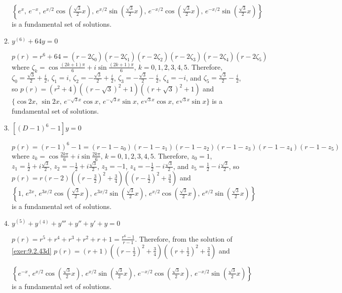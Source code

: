 \documentclass{ximera}
\begin{document}
\begin{problem}
\begin{enumerate}
\begin{solution}
 $\left\{e^x,\,e^{-x}
,\,e^{x/2}\cos\left(\frac{\sqrt3}{2}x\right),
\,e^{x/2}\sin\left(\frac{\sqrt3}{2}x\right),
\,e^{-x/2}\cos\left(\frac{\sqrt3}{2}x\right),
\,e^{-x/2}\sin\left(\frac{\sqrt3}{2}x\right)\right\}$
is a fundamental set of solutions.
\end{solution}

\item $y^{(6)}+64y=0$

\begin{solution}
$p(r)=r^6+64=(r-2\zeta_0)(r-2\zeta_1)(r-2\zeta_2)(r-2\zeta_3)
(r-2\zeta_4)(r-2\zeta_5)$ where
$\zeta_k=\cos\frac{(2k+1)\pi}{6}+i\sin\frac{(2k+1)\pi}{6}$,
$k=0,1,2,3,4,5$. Therefore,
$\zeta_0=\frac{\sqrt3}{2}+\frac{i}{2}$,
$\zeta_1=i$,
$\zeta_2=-\frac{\sqrt3}{2}+\frac{i}{2}$,
$\zeta_3=-\frac{\sqrt3}{2}-\frac{i}{2}$,
$\zeta_4=-i$, and
$\zeta_5=\frac{\sqrt3}{2}-\frac{i}{2}$,  so
$p(r)=(r^2+4)((r-\sqrt3)^2+1)((r+\sqrt3)^2+1)$ and
 $\{\cos2x,\,\sin2x,\,e^{-\sqrt3x}\cos x,\,e^{-\sqrt3x}\sin x
,\,e^{\sqrt3x}\cos x,\,e^{\sqrt3x}\sin x\}$
is a fundamental set of solutions.
\end{solution}

\item $\left[(D-1)^6-1\right]y=0$

\begin{solution}
$p(r)=(r-1)^6-1=(r-1-z_0)(r-1-z_1)(r-1-z_2)(r-1-z_3)(r-1-z_4)(r-1-z_5)$
where
$z_k=\cos\frac{2k\pi}{6}+i\sin\frac{2k\pi}{6}$,
$k=0,1,2,3,4,5$. Therefore,
$z_0=1$,
$z_1=\frac{1}{2}+i\frac{\sqrt3}{2}$,
$z_2=-\frac{1}{2}+i\frac{\sqrt3}{2}$,
$z_3=-1$,
$z_4=-\frac{1}{2}-i\frac{\sqrt3}{2}$,
and $z_5=\frac{1}{2}-i\frac{\sqrt3}{2}$, so
$p(r)=r(r-2)\left(\left(r-\frac{3}{2}\right)^2+\frac{3}{4}\right)
\left(\left(r-\frac{1}{2}\right)^2+\frac{3}{4}\right)$ and
$\left\{1,\,e^{2x}
,\,e^{3x/2}\cos\left(\frac{\sqrt3}{2}x\right),
\,e^{3x/2}\sin\left(\frac{\sqrt3}{2}x\right),
\,e^{x/2}\cos\left(\frac{\sqrt3}{2}x\right),
\,e^{x/2}\sin\left(\frac{\sqrt3}{2}x\right)\right\}$
is a fundamental set of solutions.
\end{solution}

\item $y^{(5)}+y^{(4)}+y'''+y''+y'+y=0$

\begin{solution}
$p(r)=r^5+r^4+r^3+r^2+r+1=\frac{r^6-1}{r-1}$. Therefore,
from the solution of \ref{exer:9.2.43d}
$p(r)=(r+1)\left(\left(r-\frac{1}{2}\right)^2+\frac{3}{4}\right)
\left(\left(r+\frac{1}{2}\right)^2+\frac{3}{4}\right)$ and

$\left\{e^{-x}
,\,e^{x/2}\cos\left(\frac{\sqrt3}{2}x\right),
\,e^{x/2}\sin\left(\frac{\sqrt3}{2}x\right),
\,e^{-x/2}\cos\left(\frac{\sqrt3}{2}x\right),
\,e^{-x/2}\sin\left(\frac{\sqrt3}{2}x\right)\right\}$
is a fundamental set of solutions.
\end{solution}
\end{enumerate}
\end{problem}
\end{document}
